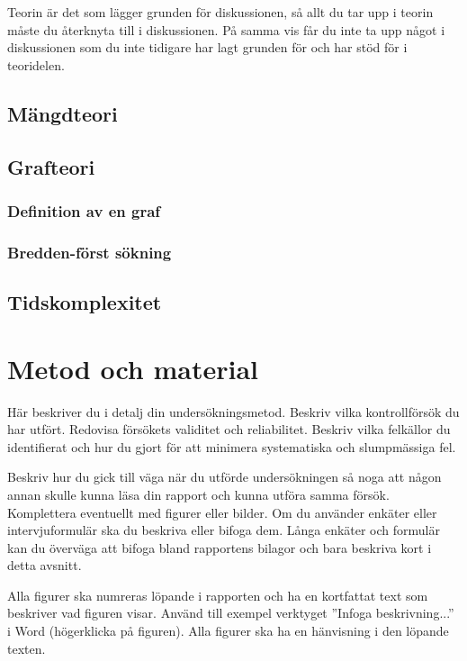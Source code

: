 \documentclass{article}
\begin{document}
Teorin är det som lägger grunden för diskussionen, så allt du tar upp i teorin måste du återknyta till i diskussionen. På samma vis får du inte ta upp något i diskussionen som du inte tidigare har lagt grunden för och har stöd för i teoridelen.

\subsection{Mängdteori}


\subsection{Grafteori}


\subsubsection{Definition av en graf}


\subsubsection{Bredden-först sökning}


\subsection{Tidskomplexitet}


\section{Metod och material}
Här beskriver du i detalj din undersökningsmetod. Beskriv vilka kontrollförsök du har utfört. Redovisa försökets validitet och reliabilitet. Beskriv vilka felkällor du identifierat och hur du gjort för att minimera systematiska och slumpmässiga fel.

Beskriv hur du gick till väga när du utförde undersökningen så noga att någon annan skulle kunna läsa din rapport och kunna utföra samma försök. Komplettera eventuellt med figurer eller bilder. Om du använder enkäter eller intervjuformulär ska du beskriva eller bifoga dem. Långa enkäter och formulär kan du överväga att bifoga bland rapportens bilagor och bara beskriva kort i detta avsnitt.

Alla figurer ska numreras löpande i rapporten och ha en kortfattat text som beskriver vad figuren visar. Använd till exempel verktyget ”Infoga beskrivning...” i Word (högerklicka på figuren). Alla figurer ska ha en hänvisning i den löpande texten.
\end{document}
